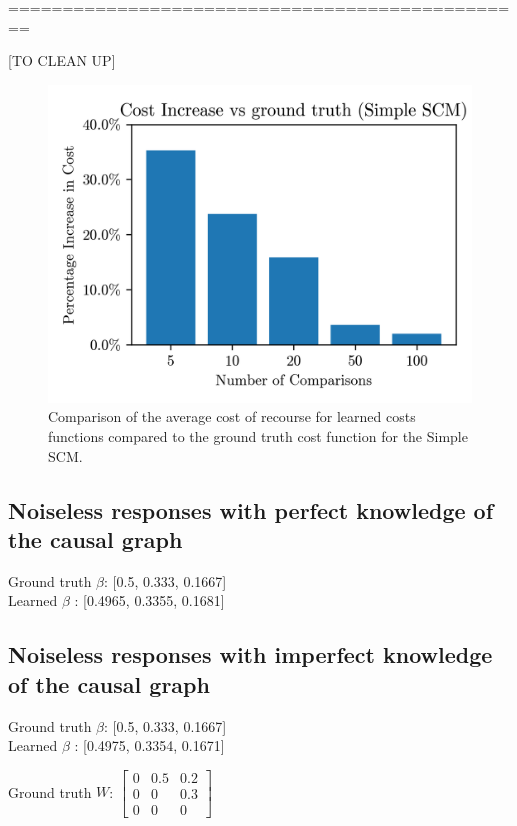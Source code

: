 ================================================

[TO CLEAN UP]

\begin{figure}[!htb]
	\centering
	\includegraphics[scale=1]{images/simpleSCM_comparison_results.png}
	\caption{Comparison of the average cost of recourse for learned costs functions compared to the ground truth cost function for the Simple SCM.}
	\label{fig:simple_scm}
\end{figure}


\subsection{Noiseless responses with perfect knowledge of the causal graph}

Ground truth $\beta$: [0.5, 0.333, 0.1667] \\
Learned $\beta$ : [0.4965, 0.3355, 0.1681]

\subsection{Noiseless responses with imperfect knowledge of the causal graph}

Ground truth $\beta$: [0.5, 0.333, 0.1667] \\
Learned $\beta$ : [0.4975, 0.3354, 0.1671]

Ground truth $W$: $\begin{bmatrix}
	0 & 0.5 & 0.2 \\
	0 & 0 & 0.3 \\
	0 & 0 & 0
\end{bmatrix}$

